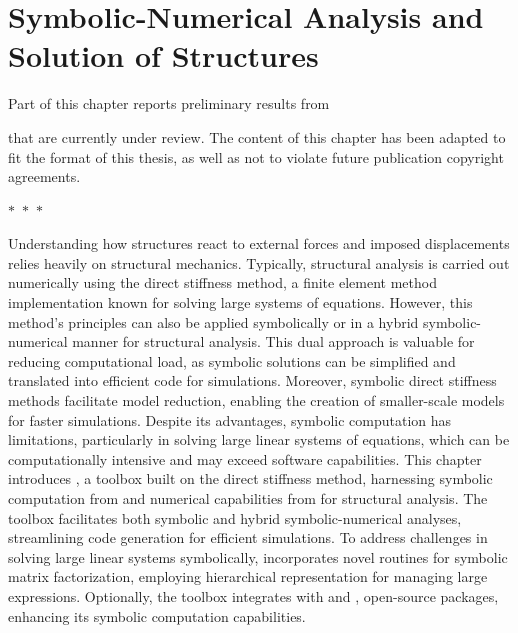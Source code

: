 
\chapter{Symbolic-Numerical Analysis and Solution of Structures}
\label{app4:chap:symbolic_structural_analysis}

Part of this chapter reports preliminary results from~\cite{stocco2024trussme, larcher2024symbolic}
%
\begin{center}
  \begin{minipage}{0.9\textwidth}
  \end{minipage}
\end{center}
\begin{center}
  \begin{minipage}{0.9\textwidth}
  \end{minipage}
\end{center}
%
that are currently under review. The content of this chapter has been adapted to fit the format of this thesis, as well as not to violate future publication copyright agreements.

\begin{center}
  $\ast$~$\ast$~$\ast$
\end{center}

Understanding how structures react to external forces and imposed displacements relies heavily on structural mechanics. Typically, structural analysis is carried out numerically using the direct stiffness method, a finite element method implementation known for solving large systems of equations. However, this method's principles can also be applied symbolically or in a hybrid symbolic-numerical manner for structural analysis. This dual approach is valuable for reducing computational load, as symbolic solutions can be simplified and translated into efficient code for simulations. Moreover, symbolic direct stiffness methods facilitate model reduction, enabling the creation of smaller-scale models for faster simulations. Despite its advantages, symbolic computation has limitations, particularly in solving large linear systems of equations, which can be computationally intensive and may exceed software capabilities. This chapter introduces \TrussMe{}, a toolbox built on the direct stiffness method, harnessing symbolic computation from \Maple{} and numerical capabilities from \Matlab{} for structural analysis. The toolbox facilitates both symbolic and hybrid symbolic-numerical analyses, streamlining code generation for efficient simulations. To address challenges in solving large linear systems symbolically, \TrussMe{} incorporates novel routines for symbolic matrix factorization, employing hierarchical representation for managing large expressions. Optionally, the toolbox integrates with \LEM{} and \LAST{}, open-source \Maple{} packages, enhancing its symbolic computation capabilities.

